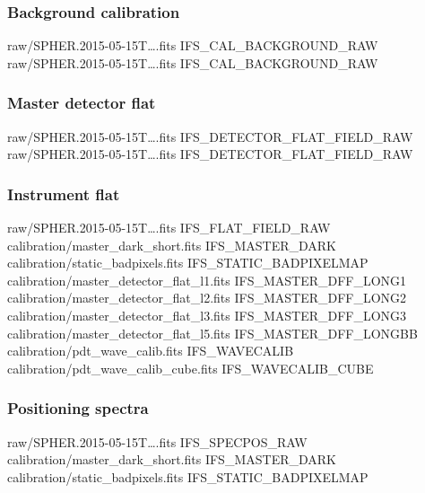 \documentclass[twoside,single]{lion-msc}
\begin{document}
\subsubsection*{Background calibration}
\begin{mdframed}[linewidth = 0.3mm, linecolor = black]
raw/SPHER.2015-05-15T\dots.fits IFS\_CAL\_BACKGROUND\_RAW\\
raw/SPHER.2015-05-15T\dots.fits IFS\_CAL\_BACKGROUND\_RAW
\end{mdframed}

\subsubsection*{Master detector flat}
\begin{mdframed}[linewidth = 0.3mm, linecolor = black]
raw/SPHER.2015-05-15T\dots.fits IFS\_DETECTOR\_FLAT\_FIELD\_RAW\\
raw/SPHER.2015-05-15T\dots.fits IFS\_DETECTOR\_FLAT\_FIELD\_RAW
\end{mdframed}

\subsubsection*{Instrument flat}
\begin{mdframed}[linewidth = 0.3mm, linecolor = black]
raw/SPHER.2015-05-15T\dots.fits IFS\_FLAT\_FIELD\_RAW\\
calibration/master\_dark\_short.fits IFS\_MASTER\_DARK\\
calibration/static\_badpixels.fits IFS\_STATIC\_BADPIXELMAP\\
calibration/master\_detector\_flat\_l1.fits IFS\_MASTER\_DFF\_LONG1\\
calibration/master\_detector\_flat\_l2.fits IFS\_MASTER\_DFF\_LONG2\\
calibration/master\_detector\_flat\_l3.fits IFS\_MASTER\_DFF\_LONG3\\
calibration/master\_detector\_flat\_l5.fits IFS\_MASTER\_DFF\_LONGBB\\
calibration/pdt\_wave\_calib.fits IFS\_WAVECALIB\\
calibration/pdt\_wave\_calib\_cube.fits IFS\_WAVECALIB\_CUBE
\end{mdframed}

\subsubsection*{Positioning spectra}
\begin{mdframed}[linewidth = 0.3mm, linecolor = black]
raw/SPHER.2015-05-15T\dots.fits IFS\_SPECPOS\_RAW\\
calibration/master\_dark\_short.fits IFS\_MASTER\_DARK\\
calibration/static\_badpixels.fits IFS\_STATIC\_BADPIXELMAP
\end{mdframed}
\end{document}
